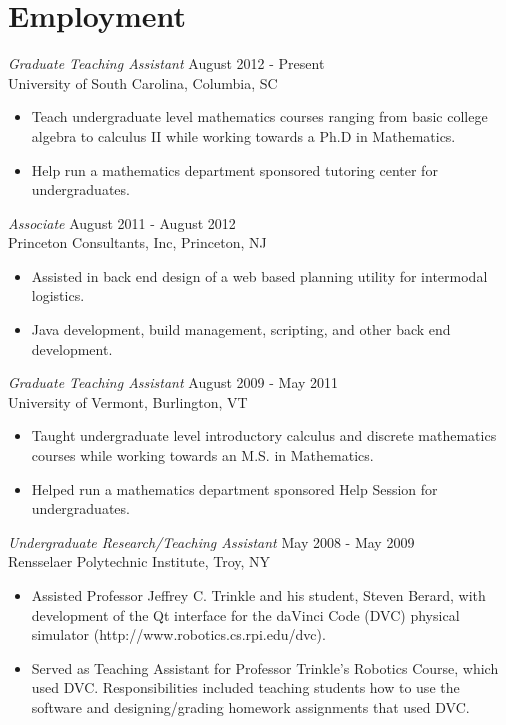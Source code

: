 \documentclass{article}
\begin{document}
  \section*{Employment}
  \textsl{Graduate Teaching Assistant} \hfill August 2012 - Present \\
  University of South Carolina, Columbia, SC
  \begin{itemize}  \itemsep -2pt %
  \item
    Teach undergraduate level mathematics courses ranging from basic college algebra to calculus II while working towards a Ph.D in Mathematics.
  \item 
    Help run a mathematics department sponsored tutoring center for undergraduates.
  \end{itemize}

  \noindent\textsl{Associate} \hfill August 2011 - August 2012\\
  Princeton Consultants, Inc, Princeton, NJ
  \begin{itemize}\itemsep -2pt
  \item
    Assisted in back end design of a web based planning utility for intermodal logistics.
  \item
    Java development, build management, scripting, and other back end development.
  \end{itemize}
  
  \noindent\textsl{Graduate Teaching Assistant} \hfill August 2009 - May 2011 \\
  University of Vermont, Burlington, VT
  \begin{itemize}  \itemsep -2pt %
  \item
    Taught undergraduate level introductory calculus and discrete mathematics courses while working towards an M.S. in Mathematics.
  \item 
    Helped run a mathematics department sponsored Help Session for undergraduates.
  \end{itemize}

  \noindent\textsl{Undergraduate Research/Teaching Assistant} \hfill May 2008 - May 2009 \\
  Rensselaer Polytechnic Institute, Troy, NY
  \begin{itemize}  \itemsep -2pt %
  \item Assisted Professor Jeffrey C. Trinkle and his student, Steven Berard, with development of the Qt interface for the daVinci Code (DVC) physical simulator (http://www.robotics.cs.rpi.edu/dvc).
  \item Served as Teaching Assistant for Professor Trinkle's Robotics Course, which used DVC.
    Responsibilities included teaching students how to use the software and designing/grading homework assignments that used DVC.
  \end{itemize}
\end{document}
